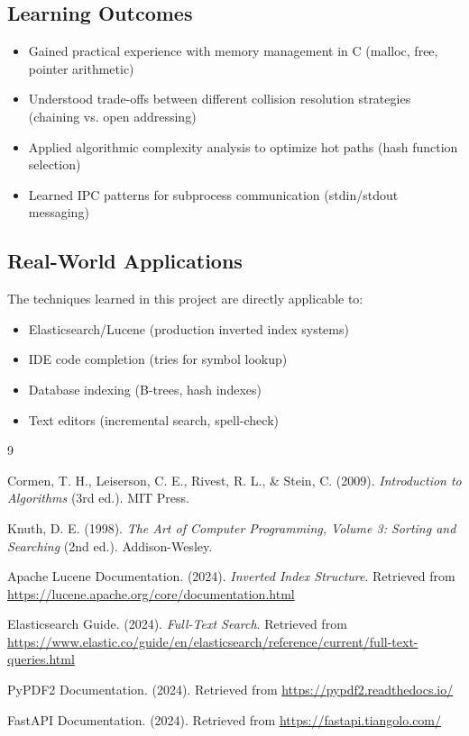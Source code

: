 \documentclass[12pt,a4paper]{article}
\begin{document}
\subsection{Learning Outcomes}
\begin{itemize}
    \item Gained practical experience with memory management in C (malloc, free, pointer arithmetic)
    \item Understood trade-offs between different collision resolution strategies (chaining vs. open addressing)
    \item Applied algorithmic complexity analysis to optimize hot paths (hash function selection)
    \item Learned IPC patterns for subprocess communication (stdin/stdout messaging)
\end{itemize}

\subsection{Real-World Applications}
The techniques learned in this project are directly applicable to:
\begin{itemize}
    \item Elasticsearch/Lucene (production inverted index systems)
    \item IDE code completion (tries for symbol lookup)
    \item Database indexing (B-trees, hash indexes)
    \item Text editors (incremental search, spell-check)
\end{itemize}

\newpage
\begin{thebibliography}{9}

Cormen, T. H., Leiserson, C. E., Rivest, R. L., \& Stein, C. (2009). 
\textit{Introduction to Algorithms} (3rd ed.). MIT Press.

Knuth, D. E. (1998). 
\textit{The Art of Computer Programming, Volume 3: Sorting and Searching} (2nd ed.). Addison-Wesley.

Apache Lucene Documentation. (2024). 
\textit{Inverted Index Structure}. 
Retrieved from \url{https://lucene.apache.org/core/documentation.html}

Elasticsearch Guide. (2024). 
\textit{Full-Text Search}. 
Retrieved from \url{https://www.elastic.co/guide/en/elasticsearch/reference/current/full-text-queries.html}

PyPDF2 Documentation. (2024). 
Retrieved from \url{https://pypdf2.readthedocs.io/}

FastAPI Documentation. (2024). 
Retrieved from \url{https://fastapi.tiangolo.com/}

\end{thebibliography}
\end{document}
